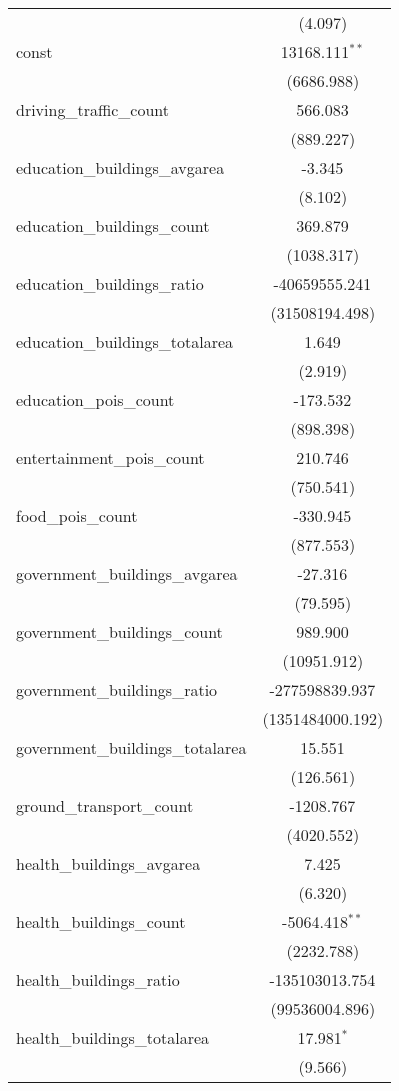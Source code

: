 \begin{table}[!htbp]
\begin{tabular}{@{\extracolsep{5pt}}lc}
  & (4.097) \\
 const & 13168.111$^{**}$ \\
  & (6686.988) \\
 driving_traffic_count & 566.083$^{}$ \\
  & (889.227) \\
 education_buildings_avgarea & -3.345$^{}$ \\
  & (8.102) \\
 education_buildings_count & 369.879$^{}$ \\
  & (1038.317) \\
 education_buildings_ratio & -40659555.241$^{}$ \\
  & (31508194.498) \\
 education_buildings_totalarea & 1.649$^{}$ \\
  & (2.919) \\
 education_pois_count & -173.532$^{}$ \\
  & (898.398) \\
 entertainment_pois_count & 210.746$^{}$ \\
  & (750.541) \\
 food_pois_count & -330.945$^{}$ \\
  & (877.553) \\
 government_buildings_avgarea & -27.316$^{}$ \\
  & (79.595) \\
 government_buildings_count & 989.900$^{}$ \\
  & (10951.912) \\
 government_buildings_ratio & -277598839.937$^{}$ \\
  & (1351484000.192) \\
 government_buildings_totalarea & 15.551$^{}$ \\
  & (126.561) \\
 ground_transport_count & -1208.767$^{}$ \\
  & (4020.552) \\
 health_buildings_avgarea & 7.425$^{}$ \\
  & (6.320) \\
 health_buildings_count & -5064.418$^{**}$ \\
  & (2232.788) \\
 health_buildings_ratio & -135103013.754$^{}$ \\
  & (99536004.896) \\
 health_buildings_totalarea & 17.981$^{*}$ \\
  & (9.566) \\

\end{tabular}
\end{table}
